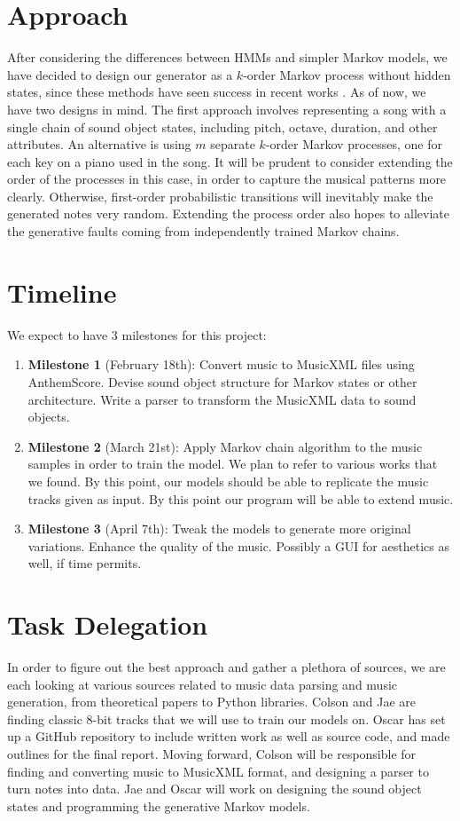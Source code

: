 \documentclass{article}
\begin{document}
\section{Approach}
After considering the differences between HMMs and simpler Markov models, we have decided to design our generator as a $k$-order Markov process without hidden states, 
since these methods have seen success in recent works \cite{shapiro_huber_2021,correa_jungling_small_2020}. As of now, we have two designs in mind. The first approach 
involves representing a song with a single chain of sound object states, including pitch, octave, duration, and other attributes. An alternative is using $m$ separate 
$k$-order Markov processes, one for each key on a piano used in the song. It will be prudent to consider extending the order of the processes in this case, in order to 
capture the musical patterns more clearly. Otherwise, first-order probabilistic transitions will inevitably make the generated notes very random. Extending the process 
order also hopes to alleviate the generative faults coming from independently trained Markov chains.

\section{Timeline}
We expect to have 3 milestones for this project:
\begin{enumerate}
  \item \textbf{Milestone 1} (February 18th): Convert music to MusicXML files using AnthemScore. Devise sound object structure for Markov states or other architecture. 
  Write a parser to transform the MusicXML data to sound objects. 
  \item \textbf{Milestone 2} (March 21st): Apply Markov chain algorithm to the music samples in order to train the model. We plan to refer to various works that we found.
  By this point, our models should be able to replicate the music tracks given as input. By this point our program will be able to extend music.
  \item \textbf{Milestone 3} (April 7th): Tweak the models to generate more original variations. Enhance the quality of the music. Possibly a GUI for aesthetics as well, 
  if time permits.
\end{enumerate}

\section{Task Delegation}
In order to figure out the best approach and gather a plethora of sources, we are each looking at various sources related to music data parsing and music generation, 
from theoretical papers to Python libraries. Colson and Jae are finding classic 8-bit tracks that we will use to train our models on. Oscar has set up a GitHub repository 
to include written work as well as source code, and made outlines for the final report. Moving forward, Colson will be responsible for finding and converting music to 
MusicXML format, and designing a parser to turn notes into data. Jae and Oscar will work on designing the sound object states and programming the generative Markov models. 
\end{document}
